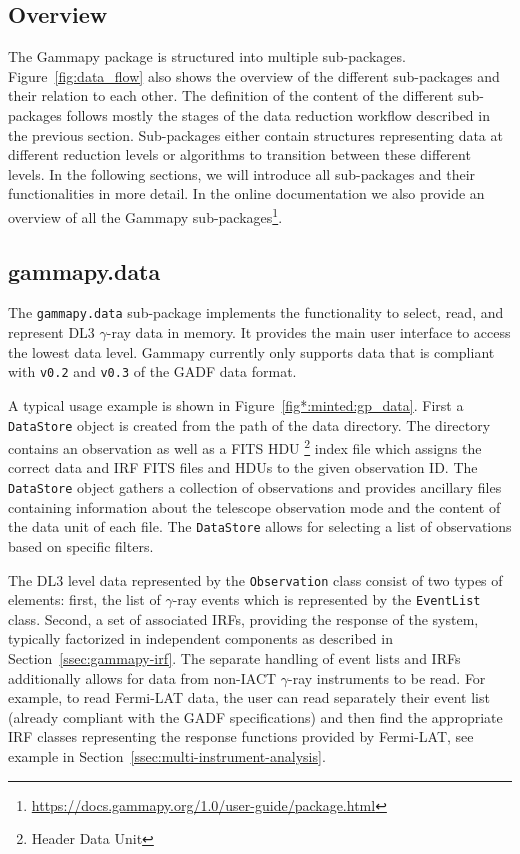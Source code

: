 \documentclass[longauth]{aa}
\newcommand{\code}[1]{\texttt{#1}}
\newcommand{\gammapy}{Gammapy\xspace}
\newcommand{\fermi}{Fermi-LAT\xspace}
\newcommand{\gammaray}{$\gamma$-ray\xspace}
\newcommand{\gadf}{GADF\xspace}
\begin{document}
\subsection{Overview}
\label{ssec:overview}
%
The \gammapy package is structured into multiple sub-packages. 
Figure~\ref{fig:data_flow} also shows the overview of the different sub-packages and
their relation to each other. The definition
of the content of the different sub-packages follows mostly the stages of the
data reduction workflow described in the previous section. Sub-packages either
contain structures representing data at different reduction levels or algorithms
to transition between these different levels. In the following sections, we will
introduce all sub-packages and their functionalities in more detail. In the online 
documentation we also provide an overview of all the \gammapy sub-packages\footnote{\url{https://docs.gammapy.org/1.0/user-guide/package.html}}.


\subsection{gammapy.data}
\label{ssec:gammapy-data}
The \code{gammapy.data} sub-package implements the functionality to select,
read, and represent DL3 \gammaray data in memory. It provides the main user
interface to access the lowest data level. \gammapy currently only
supports data that is compliant with \code{v0.2} and \code{v0.3} of the \gadf data format.

A typical usage example is shown in Figure~\ref{fig*:minted:gp_data}.
First a \code{DataStore} object is created from the path of the data
directory. The directory contains an observation as well as a FITS HDU \footnote{Header Data Unit} 
index file which assigns the correct data and IRF FITS files and HDUs
to the given observation ID. The \code{DataStore}
object gathers a collection of observations and provides ancillary
files containing information about the telescope observation mode and the
content of the data unit of each file. The \code{DataStore} allows for
selecting a list of observations based on specific filters.

The DL3 level data represented by the \code{Observation} class consist
of two types of elements: first, the list of \gammaray events 
which is represented by the \code{EventList} class. Second, a set of
associated IRFs, providing the response of the system, typically
factorized in independent components as described in
Section~\ref{ssec:gammapy-irf}. The separate handling of event lists and IRFs
additionally allows for data from non-IACT \gammaray instruments to be read. For
example, to read \fermi data, the user can read separately their event list
(already compliant with the \gadf specifications) and then find the appropriate
IRF classes representing the response functions provided by \fermi, see
example in Section~\ref{ssec:multi-instrument-analysis}.
\end{document}

